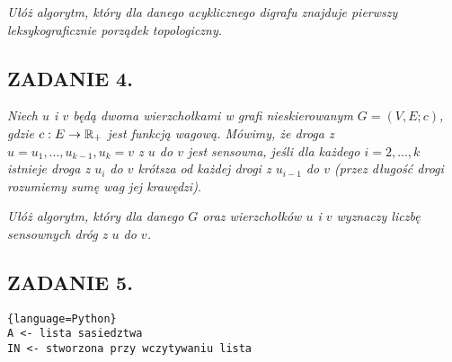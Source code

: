 \documentclass{article}
\begin{document}
\emph{Ułóż algorytm, który dla danego acyklicznego digrafu znajduje pierwszy leksykograficznie porządek topologiczny.}
\smallskip

\subsection*{ZADANIE 4.}
\emph{Niech $u$ i $v$ będą dwoma wierzchołkami w grafi nieskierowanym $G=(V, E; c)$, gdzie $c:E\to \mathbb{R}_+$ jest funkcją wagową. Mówimy, że droga z $u=u_1,...,u_{k-1},u_k=v$ z $u$ do $v$ jest sensowna, jeśli dla każdego $i=2,...,k$ istnieje droga z $u_i$ do $v$ krótsza od każdej drogi z $u_{i-1}$ do $v$ (przez długość drogi rozumiemy sumę wag jej krawędzi).}

\emph{Ułóż algorytm, który dla danego $G$ oraz wierzchołków $u$ i $v$ wyznaczy liczbę sensownych dróg z $u$ do $v$.}

\subsection*{ZADANIE 5.}

\begin{lstlisting}{language=Python}
A <- lista sasiedztwa
IN <- stworzona przy wczytywaniu lista 


\end{lstlisting}
\end{document}
